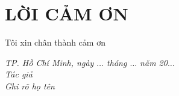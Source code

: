 \pagestyle{fancy}
\fancyhf{}
\fancyhead[C]{\thepage}
\renewcommand{\headrulewidth}{0pt}

\chapter*{\centering LỜI CẢM ƠN}
Tôi xin chân thành cảm ơn\dotfill

\dotfill

\dotfill

\vspace*{1cm}
\begin{flushright}
	\begin{minipage}{8.75cm}
		\centering\itshape
		TP. Hồ Chí Minh, ngày $\ldots$ tháng $\ldots$ năm 20$\ldots$\\
		Tác giả\\[3cm]
		Ghi rõ họ tên
	\end{minipage}
\end{flushright}
\newpage